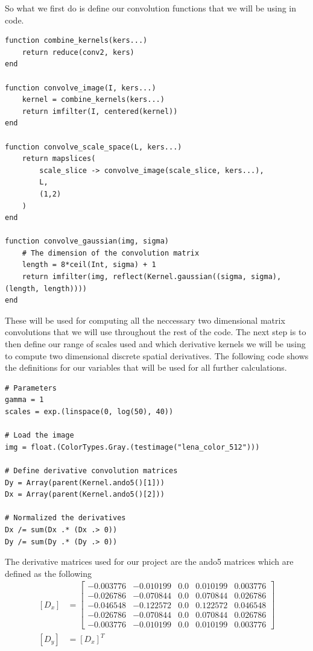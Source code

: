 \documentclass{article}
\begin{document}
So what we first do is define our convolution functions that we will be using in code.
\begin{lstlisting}
function combine_kernels(kers...)
    return reduce(conv2, kers)
end

function convolve_image(I, kers...)
    kernel = combine_kernels(kers...)
    return imfilter(I, centered(kernel))
end

function convolve_scale_space(L, kers...)
    return mapslices(
        scale_slice -> convolve_image(scale_slice, kers...),
        L,
        (1,2)
    )
end

function convolve_gaussian(img, sigma)
    # The dimension of the convolution matrix
    length = 8*ceil(Int, sigma) + 1
    return imfilter(img, reflect(Kernel.gaussian((sigma, sigma), (length, length))))
end
\end{lstlisting}
These will be used for computing all the neccessary two dimensional matrix convolutions that we will use throughout the rest of the code.
The next step is to then define our range of scales used and which derivative kernels we will be using to compute two dimensional discrete spatial derivatives.
The following code shows the definitions for our variables that will be used for all further calculations. 
\begin{lstlisting}
# Parameters
gamma = 1
scales = exp.(linspace(0, log(50), 40))

# Load the image
img = float.(ColorTypes.Gray.(testimage("lena_color_512")))

# Define derivative convolution matrices
Dy = Array(parent(Kernel.ando5()[1]))
Dx = Array(parent(Kernel.ando5()[2]))

# Normalized the derivatives
Dx /= sum(Dx .* (Dx .> 0))
Dy /= sum(Dy .* (Dy .> 0))
\end{lstlisting}
The derivative matrices used for our project are the ando5 matrices which are defined as the following
\begin{equation}
  \begin{aligned}
    [D_x] &=
    \begin{bmatrix}
      -0.003776 &-0.010199  &0.0  &0.010199  &0.003776 \\
      -0.026786 &-0.070844  &0.0  &0.070844  &0.026786 \\
      -0.046548 &-0.122572  &0.0  &0.122572  &0.046548 \\
      -0.026786 &-0.070844  &0.0  &0.070844  &0.026786 \\
      -0.003776 &-0.010199  &0.0  &0.010199  &0.003776
    \end{bmatrix} \\
    [D_y] &= [D_x]^T
  \end{aligned}
\end{equation}
\end{document}
